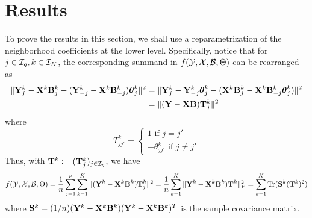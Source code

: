 \documentclass[fleqn,11pt]{article}
\DeclareMathOperator*{\Tr}{Tr}
\numberwithin{equation}{section}
\begin{document}
\section{Results}
To prove the results in this section, we shall use a reparametrization of the neighborhood coefficients at the lower level. Specifically, notice that for $j \in {\cal{I}}_q, k \in {\cal{I}}_K$, the corresponding summand in $f({\cal{Y}}, {\cal{X}}, {\cal{B}}, \Theta)$ can be rearranged as
%
\begin{align*}
\| {\mathbf{Y}}^k_j - {\mathbf{X}}^k {\mathbf{B}}_j^k - ({\mathbf{Y}}_{-j}^k - {\mathbf{X}}^k {\mathbf{B}}_{-j}^k) {\boldsymbol{\theta}}_j^k \|^2 &=
\| {\mathbf{Y}}^k_j - {\mathbf{Y}}_{-j}^k {\boldsymbol{\theta}}_j^k - ({\mathbf{X}}^k {\mathbf{B}}_j^k -{\mathbf{X}}^k {\mathbf{B}}_{-j}^k {\boldsymbol{\theta}}_j^k) \|^2 \\
&= \| ( {\mathbf{Y}} - {\mathbf{X}} {\mathbf{B}} ) {\mathbf{T}}_j^k \|^2
\end{align*}
%
where
%
$$
T_{jj'}^k = \begin{cases}
1 \text{ if } j = j'\\
- \theta_{jj'}^k \text{ if } j \neq j'
\end{cases}
$$
%
Thus, with ${\mathbf{T}}^k := ({\mathbf{T}}_j^k)_{j \in {\cal{I}}_q}$, we have
$$
f( \cY, \cX, \cB, \Theta) = \frac{1}{n} \sum_{j=1}^p \sum_{k=1}^K \| ( \bfY^k - \bfX^k \bfB^k ) \bfT_j^k \|^2
= \frac{1}{n} \sum_{k=1}^K \| \bfY^k - \bfX^k \bfB^k ) \bfT^k \|_F^2
= \sum_{k=1}^K \Tr (\bfS^k (\bfT^k)^2 )
$$
%
where ${\mathbf{S}}^k = (1/n) ({\mathbf{Y}}^k - {\mathbf{X}}^k {\mathbf{B}}^k) ({\mathbf{Y}}^k - {\mathbf{X}}^k {\mathbf{B}}^k)^T$ is the sample covariance matrix.
\end{document}
